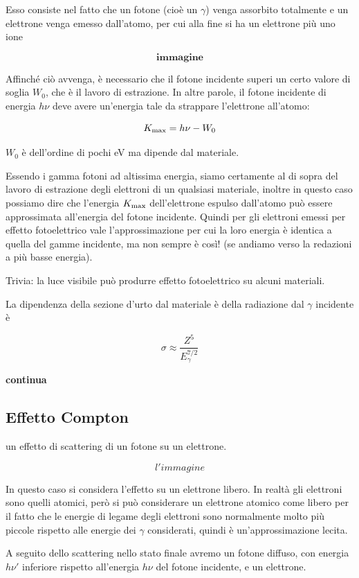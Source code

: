 Esso consiste nel fatto che un fotone (cioè un $\gamma$) venga assorbito totalmente e un elettrone venga emesso dall'atomo, per cui alla fine si ha un elettrone più uno ione

$$\textbf{immagine}$$

Affinché ciò avvenga, è necessario che il fotone incidente superi un certo valore di soglia $W_0$, che è il lavoro di estrazione. In altre parole, il fotone incidente di energia $h\nu$ deve avere un'energia tale da strappare l'elettrone all'atomo:

$$K_{\rm max}=h\nu - W_0$$

$W_0$ è dell'ordine di pochi eV ma dipende dal materiale.

Essendo i gamma fotoni ad altissima energia, siamo certamente al di sopra del lavoro di estrazione degli elettroni di un qualsiasi materiale, inoltre in questo caso possiamo dire che l'energia $K_{\rm max}$ dell'elettrone espulso dall'atomo può essere approssimata all'energia del fotone incidente. Quindi per gli elettroni emessi per effetto fotoelettrico vale l'approssimazione per cui la loro energia è identica a quella del gamme incidente, ma non sempre è così! (se andiamo verso la redazioni a più basse energia).

Trivia: la luce visibile può produrre effetto fotoelettrico su alcuni materiali.

La dipendenza della sezione d'urto dal materiale è della radiazione dal $\gamma$ incidente è

$$\sigma \approx \frac{Z^5}{E_{\gamma}^{7/2}}$$

\textbf{continua}

\subsection{Effetto Compton}

\E un effetto di scattering di un fotone su un elettrone.

$$l'immagine$$

In questo caso si considera l'effetto su un elettrone libero. In realtà gli elettroni sono quelli atomici, però si può considerare un elettrone atomico come libero per il fatto che le energie di legame degli elettroni sono normalmente molto più piccole rispetto alle energie dei $\gamma$ considerati, quindi è un'approssimazione lecita. 

A seguito dello scattering nello stato finale avremo un fotone diffuso, con energia $h\nu'$ inferiore rispetto all'energia $h\nu$ del fotone incidente, e un elettrone.

